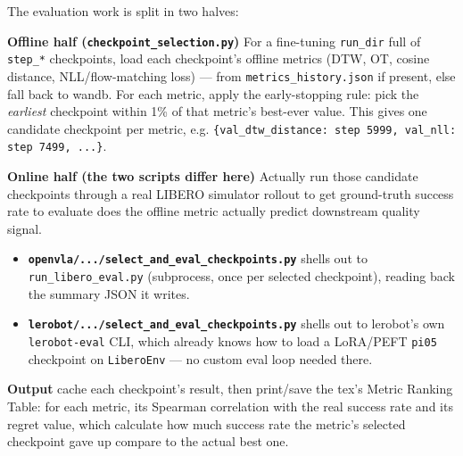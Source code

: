 \documentclass[11pt]{article}
\begin{document}
The evaluation work is split in two halves:

\textbf{Offline half (\verb|checkpoint_selection.py|)} For a fine-tuning \verb|run_dir| full of \verb|step_*| checkpoints, load each checkpoint's offline metrics (DTW, OT, cosine distance, NLL/flow-matching loss) — from \verb|metrics_history.json| if present, else fall back to wandb. For each metric, apply the early-stopping rule: pick the \textit{earliest} checkpoint within 1\% of that metric's best-ever value. This gives one candidate checkpoint per metric, e.g. \verb|{val_dtw_distance: step 5999, val_nll: step 7499, ...}|.

\textbf{Online half (the two scripts differ here)} Actually run those candidate checkpoints through a real LIBERO simulator rollout to get ground-truth success rate to evaluate does the offline metric actually predict downstream quality signal.

\begin{itemize}
    \item \textbf{\verb|openvla/.../select_and_eval_checkpoints.py|} shells out to \verb|run_libero_eval.py| (subprocess, once per selected checkpoint), reading back the summary JSON it writes.
    \item \textbf{\verb|lerobot/.../select_and_eval_checkpoints.py|} shells out to lerobot's own \verb|lerobot-eval| CLI, which already knows how to load a LoRA/PEFT \verb|pi05| checkpoint on \verb|LiberoEnv| — no custom eval loop needed there.
\end{itemize}
\textbf{Output} cache each checkpoint's result, then print/save the tex's Metric Ranking Table: for each metric, its Spearman correlation with the real success rate and its regret value, which calculate how much success rate the metric's selected checkpoint gave up compare to the actual best one.
\end{document}
